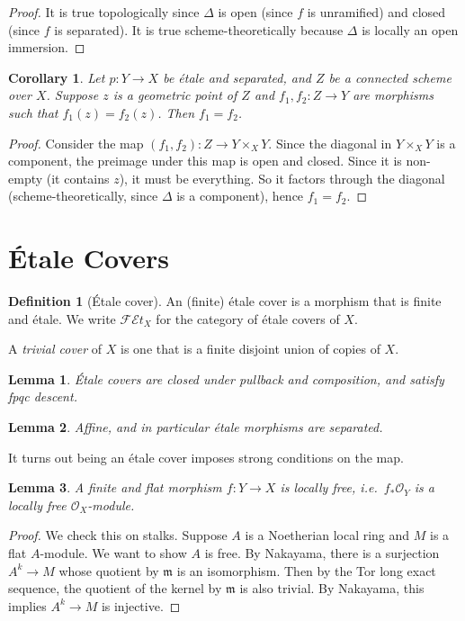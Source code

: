 \documentclass{shortart}
\newtheorem*{lemma}{Lemma}
\newtheorem*{cor}{Corollary}
\theoremstyle{definition}
\newtheorem*{defi}{Definition}
\newcommand\FEt[1]{\mathscr{FE}t_{#1}}
\begin{document}
\begin{proof}
  It is true topologically since $\Delta$ is open (since $f$ is unramified) and closed (since $f$ is separated). It is true scheme-theoretically because $\Delta$ is locally an open immersion.
\end{proof}

\begin{cor}
  Let $p: Y \to X$ be \'etale and separated, and $Z$ be a connected scheme over $X$. Suppose $z$ is a geometric point of $Z$ and $f_1, f_2: Z \to Y$ are morphisms such that $f_1(z) = f_2(z)$. Then $f_1 = f_2$.
\end{cor}

\begin{proof}
  Consider the map $(f_1, f_2): Z \to Y \times_X Y$. Since the diagonal in $Y \times_X Y$ is a component, the preimage under this map is open and closed. Since it is non-empty (it contains $z$), it must be everything. So it factors through the diagonal (scheme-theoretically, since $\Delta$ is a component), hence $f_1 = f_2$.
\end{proof}
\newpage
\section{\'Etale Covers}
\begin{defi}[\'Etale cover]
  An (finite) \'etale cover is a morphism that is finite and \'etale. We write $\FEt{X}$ for the category of \'etale covers of $X$.

  A \emph{trivial cover} of $X$ is one that is a finite disjoint union of copies of $X$.
\end{defi}

\begin{lemma}
  \'Etale covers are closed under pullback and composition, and satisfy fpqc descent.\fakeqed
\end{lemma}

\begin{lemma}
  Affine, and in particular \'etale morphisms are separated.\fakeqed
\end{lemma}

It turns out being an \'etale cover imposes strong conditions on the map.
\begin{lemma}
  A finite and flat morphism $f: Y \to X$ is locally free, i.e.\ $f_* \mathcal{O}_Y$ is a locally free $\mathcal{O}_X$-module.
\end{lemma}

\begin{proof}
  We check this on stalks. Suppose $A$ is a Noetherian local ring and $M$ is a flat $A$-module. We want to show $A$ is free. By Nakayama, there is a surjection $A^k \to M$ whose quotient by $\mathfrak{m}$ is an isomorphism. Then by the Tor long exact sequence, the quotient of the kernel by $\mathfrak{m}$ is also trivial. By Nakayama, this implies $A^k \to M$ is injective.
\end{proof}
\end{document}
